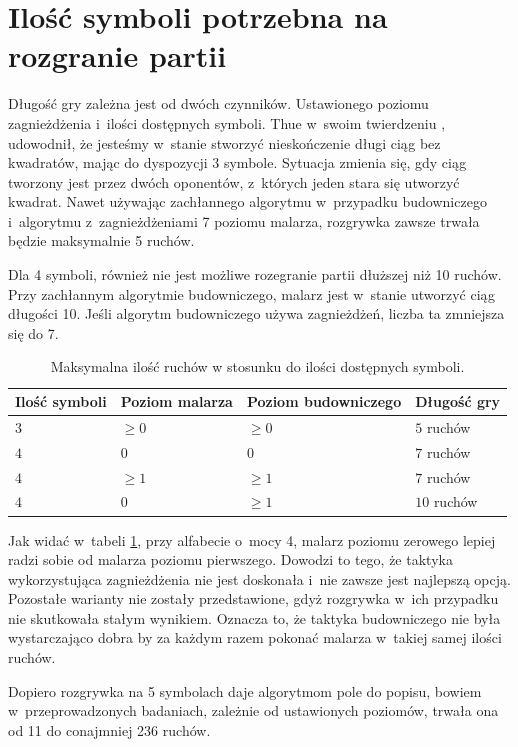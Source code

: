 \documentclass[document]{xmgr}
\begin{document}
\section{Ilość symboli potrzebna na rozgranie partii}
Długość gry zależna jest od dwóch czynników. Ustawionego poziomu zagnieżdżenia i~ilości dostępnych symboli. Thue w~swoim twierdzeniu \cite{repetition}, udowodnił, że jesteśmy w~stanie stworzyć nieskończenie długi ciąg bez kwadratów, mając do dyspozycji 3 symbole. Sytuacja zmienia się, gdy ciąg tworzony jest przez dwóch oponentów, z~których jeden stara się utworzyć kwadrat. Nawet używając zachłannego algorytmu w~przypadku budowniczego i~algorytmu z~zagnieżdżeniami 7 poziomu malarza, rozgrywka zawsze trwała będzie maksymalnie 5 ruchów. 

Dla 4 symboli, również nie jest możliwe rozegranie partii dłuższej niż 10 ruchów. Przy zachłannym algorytmie budowniczego, malarz jest w~stanie utworzyć ciąg długości 10. Jeśli algorytm budowniczego używa zagnieżdżeń, liczba ta zmniejsza się do 7.

\begin{table}[tbh]
    \centering
	\begin{tabular}{|l|l|l|l|} \hline
	Ilość symboli & Poziom malarza & Poziom budowniczego & Długość gry \\ \hline
	$3$ & $\geq 0$ & $\geq 0$ & $5$ ruchów\\ \hline
	$4$ & $0$ & $0$ & $7$ ruchów\\ \hline
	$4$ & $\geq 1 $ & $\geq 1$ & $7$ ruchów\\ \hline
	$4$ & $0$ & $\geq 1$ & $10$ ruchów\\ \hline
	\end{tabular}
	\caption{Maksymalna ilość ruchów w stosunku do ilości dostępnych symboli.}
	\label{fig:maxGameLength}
\end{table}

Jak widać w~tabeli \ref{fig:maxGameLength}, przy alfabecie o~mocy 4, malarz poziomu zerowego lepiej radzi sobie  od malarza poziomu pierwszego. Dowodzi to tego, że taktyka wykorzystująca zagnieżdżenia nie jest doskonała i~nie zawsze jest najlepszą opcją. Pozostałe warianty nie zostały przedstawione, gdyż rozgrywka w~ich przypadku nie skutkowała stałym wynikiem. Oznacza to, że taktyka budowniczego nie była wystarczająco dobra by za każdym razem pokonać malarza w~takiej samej ilości ruchów.


Dopiero rozgrywka na 5 symbolach daje algorytmom pole do popisu, bowiem w~przeprowadzonych badaniach, zależnie od ustawionych poziomów, trwała ona od 11 do conajmniej 236 ruchów.
\end{document}
